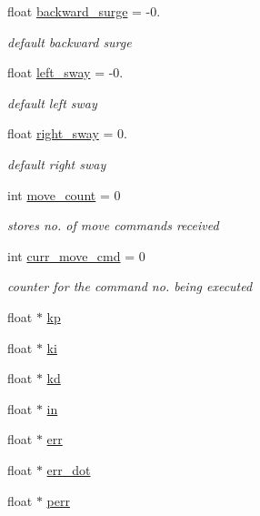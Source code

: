 \begin{DoxyCompactItemize}
float \hyperlink{classControl_a365181f0a2e284023f1bffcb91628f67}{backward\+\_\+surge} = -\/0.
\begin{DoxyCompactList}\small\item\em default backward surge \end{DoxyCompactList}\item 
float \hyperlink{classControl_a13598dbba398020d32610a1318217b29}{left\+\_\+sway} = -\/0.
\begin{DoxyCompactList}\small\item\em default left sway \end{DoxyCompactList}\item 
float \hyperlink{classControl_a944fd0cb50f0ba016a91fac4d6211a4b}{right\+\_\+sway} = 0.
\begin{DoxyCompactList}\small\item\em default right sway \end{DoxyCompactList}\item 
int \hyperlink{classControl_a5aa7f5d4f2ef0a5b28658ff4d0c42251}{move\+\_\+count} = 0
\begin{DoxyCompactList}\small\item\em stores no. of move commands received \end{DoxyCompactList}\item 
int \hyperlink{classControl_a6b9bafba66e817433e5fe291dd603518}{curr\+\_\+move\+\_\+cmd} = 0
\begin{DoxyCompactList}\small\item\em counter for the command no. being executed \end{DoxyCompactList}\item 
float $\ast$ \hyperlink{classControl_a3c190679233ca3cceaf3f3e2a00fb377}{kp}
\item 
float $\ast$ \hyperlink{classControl_aedb7684fb944d24bdf1d803f823c156c}{ki}
\item 
float $\ast$ \hyperlink{classControl_a9eaa6a8852f1a6674f39104b313568b3}{kd}
\item 
float $\ast$ \hyperlink{classControl_a76848f8d74014150f7fa48c9c76f9942}{in}
\item 
float $\ast$ \hyperlink{classControl_a79e253da9e02d0b1c9bf35824c966cb5}{err}
\item 
float $\ast$ \hyperlink{classControl_aef9f81ebc43231e739a2e58eb6b22605}{err\+\_\+dot}
\item 
float $\ast$ \hyperlink{classControl_ae1e9586e4f965eece100084c550f2b39}{perr}
\item 

\end{DoxyCompactItemize}
